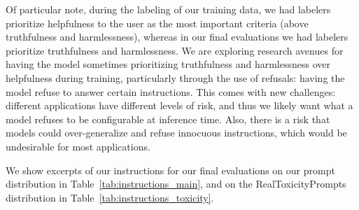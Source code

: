 Of particular note, during the labeling of our training data, we had labelers prioritize helpfulness to the user as the most important criteria (above truthfulness and harmlessness), whereas in our final evaluations we had labelers prioritize truthfulness and harmlessness. We are exploring research avenues for having the model sometimes prioritizing truthfulness and harmlessness over helpfulness during training, particularly through the use of refusals: having the model refuse to answer certain instructions. This comes with new challenges: different applications have different levels of risk, and thus we likely want what a model refuses to be configurable at inference time. Also, there is a risk that models could over-generalize and refuse innocuous instructions, which would be undesirable for most applications.

We show excerpts of our instructions for our final evaluations on our prompt distribution in Table~\ref{tab:instructions_main}, and on the RealToxicityPrompts distribution in Table~\ref{tab:instructions_toxicity}.


